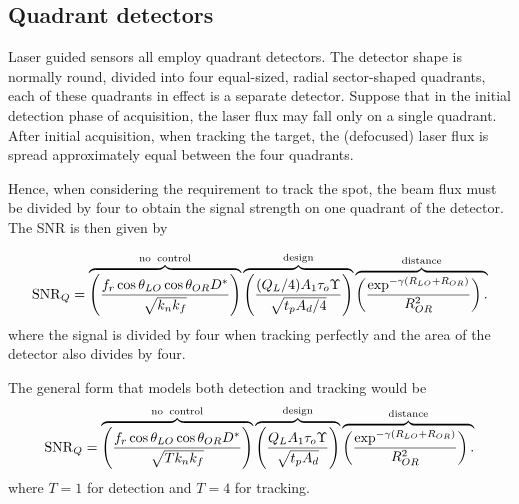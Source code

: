 


\subsection{Quadrant detectors}
\noindent
Laser guided sensors all employ quadrant detectors.  The detector shape is normally round, divided into four equal-sized, radial sector-shaped quadrants, each of these quadrants in effect is a separate detector. Suppose that in the initial detection phase of acquisition, the laser flux may fall only on a single quadrant.  After initial acquisition, when tracking the target, the (defocused) laser flux is spread approximately equal between the four quadrants.

Hence, when considering the requirement to track the spot, the beam flux must be divided by four to obtain the signal strength on one quadrant of the detector. The SNR is then given by

\begin{equation}
\operatorname{SNR}_Q=
\overbrace{
\left(\frac{f_r  \cos\theta_{LO} \cos\theta_{OR} D^\ast }{\sqrt{k_nk_f}}\right)
}^{\rm no\;\;control}
\overbrace{
\left(\frac{(Q_L/4) A_1 \tau_o \Upsilon}{\sqrt{t_p A_d/4}}\right)
}^{\rm design}
\overbrace{
\left(\frac{\exp^{-\gamma (R_{LO}+R_{OR})} }{R^2_{OR}}\right).\\
}^{\rm distance}
\label{lrfd2f}
\end{equation}
where the signal is divided by four when tracking perfectly and the area of the detector also divides by four.


The general form that models both detection and tracking would be
\begin{equation}
\operatorname{SNR}_Q=
\overbrace{
\left(\frac{f_r  \cos\theta_{LO} \cos\theta_{OR} D^\ast }{\sqrt{T k_nk_f}}\right)
}^{\rm no\;\;control}
\overbrace{
\left(\frac{Q_L A_1 \tau_o \Upsilon}{\sqrt{t_p A_d}}\right)
}^{\rm design}
\overbrace{
\left(\frac{\exp^{-\gamma (R_{LO}+R_{OR})} }{R^2_{OR}}\right).\\
}^{\rm distance}
\label{lrfd2g}
\end{equation}
where $T=1$ for detection and $T=4$ for tracking.

